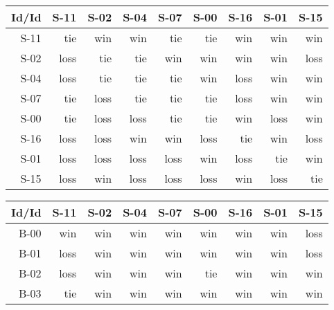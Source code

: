 \begin{tabular}{ | r | r | r | r | r | r | r | r | r | }
    \hline
        Id/Id  &   S-11  &   S-02  &   S-04  &   S-07  &   S-00  &   S-16  &   S-01  &   S-15  \\
    \hline
    \hline
         S-11  &    tie  &    win  &    win  &    tie  &    tie  &    win  &    win  &    win  \\
    \hline
         S-02  &   loss  &    tie  &    tie  &    win  &    win  &    win  &    win  &   loss  \\
    \hline
         S-04  &   loss  &    tie  &    tie  &    tie  &    win  &   loss  &    win  &    win  \\
    \hline
         S-07  &    tie  &   loss  &    tie  &    tie  &    tie  &   loss  &    win  &    win  \\
    \hline
         S-00  &    tie  &   loss  &   loss  &    tie  &    tie  &    win  &   loss  &    win  \\
    \hline
         S-16  &   loss  &   loss  &    win  &    win  &   loss  &    tie  &    win  &   loss  \\
    \hline
         S-01  &   loss  &   loss  &   loss  &   loss  &    win  &   loss  &    tie  &    win  \\
    \hline
         S-15  &   loss  &    win  &   loss  &   loss  &   loss  &    win  &   loss  &    tie  \\
    \hline
\end{tabular}


\begin{tabular}{ | r | r | r | r | r | r | r | r | r | }
    \hline
        Id/Id  &   S-11  &   S-02  &   S-04  &   S-07  &   S-00  &   S-16  &   S-01  &   S-15  \\
    \hline
    \hline
         B-00  &    win  &    win  &    win  &    win  &    win  &    win  &    win  &   loss  \\
    \hline
         B-01  &   loss  &    win  &    win  &    win  &    win  &    win  &    win  &   loss  \\
    \hline
         B-02  &   loss  &    win  &    win  &    win  &    tie  &    win  &    win  &    win  \\
    \hline
         B-03  &    tie  &    win  &    win  &    win  &    win  &    win  &    win  &    win  \\
    \hline
\end{tabular}




